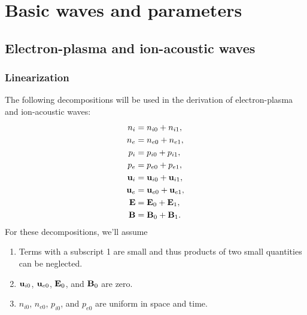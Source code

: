 \documentclass[a4paper,11pt]{report}
\begin{document}
\chapter{Basic waves and parameters}

\section{Electron-plasma and ion-acoustic waves}

\subsection{Linearization}
\label{sec:p_waves_linearization}
The following decompositions will be used in the derivation of electron-plasma and ion-acoustic waves:
\begin{align}
    n_i &= n_{i0} + n_{i1}, \nonumber \\
    n_e &= n_{e0} + n_{e1}, \nonumber \\
    p_i &= p_{i0} + p_{i1}, \nonumber \\
    p_e &= p_{e0} + p_{e1}, \nonumber \\
    \mathbf{u}_i &= \mathbf{u}_{i0} + \mathbf{u}_{i1}, \nonumber \\
    \mathbf{u}_e &= \mathbf{u}_{e0} + \mathbf{u}_{e1}, \nonumber \\
    \mathbf{E} &= \mathbf{E}_0 + \mathbf{E}_1, \nonumber \\
    \mathbf{B} &= \mathbf{B}_0 + \mathbf{B}_1.
\end{align}
For these decompositions, we'll assume
\begin{enumerate}
    \item Terms with a subscript 1 are small and thus products of two small quantities can be neglected. \label{it:p_waves_assumption_1}
    \item $\mathbf{u}_{i0}$, $\mathbf{u}_{e0}$, $\mathbf{E}_0$, and $\mathbf{B}_0$ are zero. \label{it:p_waves_assumption_2}
    \item $n_{i0}$, $n_{e0}$, $p_{i0}$, and $p_{e0}$ are uniform in space and time. \label{it:p_waves_assumption_3}
\end{enumerate}
\end{document}
